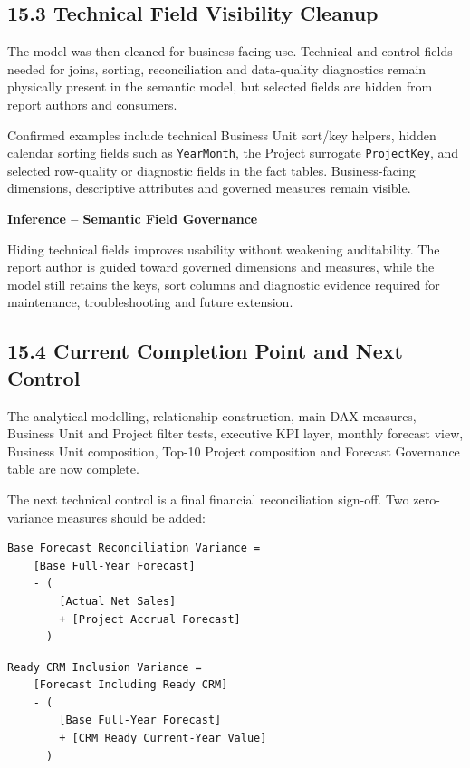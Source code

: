 \documentclass[11pt,a4paper]{article}
\begin{document}
\subsection{15.3 Technical Field Visibility Cleanup}

The model was then cleaned for business-facing use. Technical and control fields needed
for joins, sorting, reconciliation and data-quality diagnostics remain physically present
in the semantic model, but selected fields are hidden from report authors and consumers.

Confirmed examples include technical Business Unit sort/key helpers, hidden calendar
sorting fields such as \texttt{YearMonth}, the Project surrogate
\texttt{ProjectKey}, and selected row-quality or diagnostic fields in the fact tables.
Business-facing dimensions, descriptive attributes and governed measures remain visible.

\begin{inferencebox}
\textbf{Inference -- Semantic Field Governance}

Hiding technical fields improves usability without weakening auditability. The report
author is guided toward governed dimensions and measures, while the model still retains
the keys, sort columns and diagnostic evidence required for maintenance, troubleshooting
and future extension.
\end{inferencebox}

\subsection{15.4 Current Completion Point and Next Control}

The analytical modelling, relationship construction, main DAX measures, Business Unit
and Project filter tests, executive KPI layer, monthly forecast view, Business Unit
composition, Top-10 Project composition and Forecast Governance table are now complete.

The next technical control is a final financial reconciliation sign-off. Two zero-variance
measures should be added:

\begin{lstlisting}[style=powerquery]
Base Forecast Reconciliation Variance =
    [Base Full-Year Forecast]
    - (
        [Actual Net Sales]
        + [Project Accrual Forecast]
      )
\end{lstlisting}

\begin{lstlisting}[style=powerquery]
Ready CRM Inclusion Variance =
    [Forecast Including Ready CRM]
    - (
        [Base Full-Year Forecast]
        + [CRM Ready Current-Year Value]
      )
\end{lstlisting}
\end{document}
